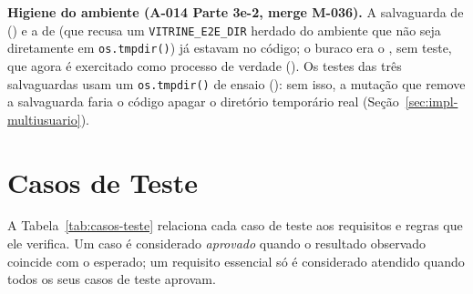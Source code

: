 \textbf{Higiene do ambiente (A-014 Parte 3e-2, merge M-036).} A salvaguarda de  () e a de  (que recusa um \texttt{VITRINE\_E2E\_DIR} herdado do ambiente que não seja  diretamente em \texttt{os.tmpdir()}) já estavam no código; o buraco era o , sem teste, que agora é exercitado como processo de verdade (). Os testes das três salvaguardas usam um \texttt{os.tmpdir()} de ensaio (): sem isso, a mutação que remove a salvaguarda faria o código apagar o diretório temporário real (Seção~\ref{sec:impl-multiusuario}).

\section{Casos de Teste}\label{sec:casos-teste}

A Tabela~\ref{tab:casos-teste} relaciona cada caso de teste aos requisitos e regras que ele verifica. Um caso é considerado \emph{aprovado} quando o resultado observado coincide com o esperado; um requisito essencial só é considerado atendido quando todos os seus casos de teste aprovam.

